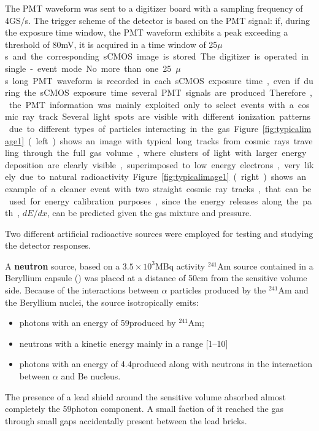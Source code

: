 \documentclass[12pt]{iopart}
\begin{document}
The PMT waveform was sent to a digitizer board with a sampling
frequency of 4\unit{GS/s}. The  trigger scheme of the detector is based on
the PMT signal: if, during the exposure time window, the PMT waveform exhibits a peak exceeding a threshold of 80\unit{mV}, it is acquired in a time
window of 25\unit{$\mu$s} and the corresponding sCMOS image is stored.
The digitizer is operated in single-event mode. No more than one  25\unit{$\mu$s} long PMT waveform
 is recorded in each sCMOS exposure time, even if during the sCMOS exposure time several PMT signals are produced.  Therefore, the PMT
information was mainly exploited only to select events with a cosmic ray
track.




Several light spots are visible with different ionization patterns due
to different types of particles interacting in the gas.
Figure~\ref{fig:typicalimage1} (left) shows an image with typical long
tracks from cosmic rays traveling through the full gas volume, where
clusters of light with larger energy deposition are clearly visible,
superimposed to low energy electrons, very likely due to natural
radioactivity.  Figure~\ref{fig:typicalimage1} (right) shows an
example of a cleaner event with two straight cosmic ray tracks, that
can be used for energy calibration purposes, since the energy releases
along the path, $dE/dx$, can be predicted given the gas mixture and
pressure.

Two different artificial radioactive sources were employed for testing and studying the detector responses.

\vspace{10pt}

A {\bf neutron} source, based on a $3.5{\times}10^3$\unit{MBq} activity
$^{241}$Am source contained in a Beryllium capsule (\ambe) was placed
at a distance of 50\unit{cm} from the sensitive volume side.  Because
of the interactions between $\alpha$ particles produced by the
$^{241}$Am and the Beryllium nuclei, the \ambe source isotropically
emits:
 \begin{itemize}
     \item photons with an energy of 59\keV produced by $^{241}$Am;
     \item neutrons with a kinetic energy mainly in a range
       [1--10]\MeV
     \item photons with an energy of 4.4\MeV produced along with
       neutrons in the interaction between $\alpha$ and Be nucleus.
 \end{itemize}
 The presence of a lead shield around the sensitive volume absorbed
almost completely the 59\keV photon component. A small faction of it
reached the gas through small gaps accidentally present between the lead
bricks.
\end{document}
